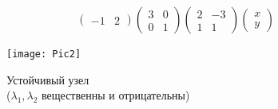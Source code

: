 \begin{figure}[!h]
\begin{minipage}[h]{0.49\linewidth}
\begin{gather*}
\begin{pmatrix}
				-1 & 2
			\end{pmatrix}
			\begin{pmatrix}
				3 & 0\\
				0 & 1
			\end{pmatrix}
			\begin{pmatrix}
				2 & -3\\
				1 & 1
			\end{pmatrix}
			\begin{pmatrix}
				x \\ y
			\end{pmatrix}
		\end{gather*}
	\end{minipage}
	\begin{minipage}[h]{0.49\linewidth}
		\texttt{[image: Pic2]}
		\caption{Устойчивый узел \\ ($\lambda_1, \lambda_2$ вещественны и отрицательны)}
	\end{minipage}
\end{figure}


\newpage
